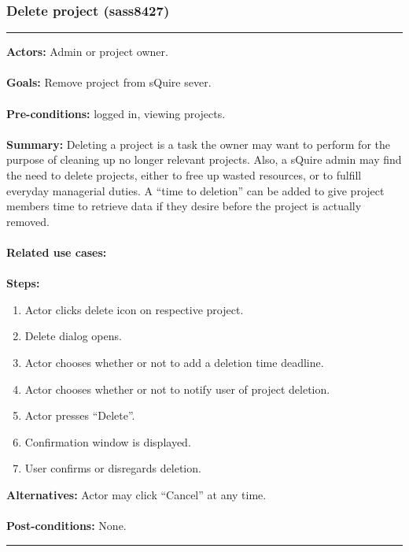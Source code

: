 \documentclass[11pt]{report}
\begin{document}
\subsubsection{Delete project (sass8427)}
\vspace{2pt}
\hrule
\vspace{8pt}
 \textbf{Actors:} Admin or project owner. \\ \\
\textbf{Goals:} Remove project from sQuire sever. \\ \\
 \textbf{Pre-conditions:} logged in, viewing projects.  \\ \\
\textbf{Summary:} Deleting a project is a task the owner may want to perform for the purpose of cleaning up no longer relevant projects. Also, a sQuire admin may find the need to delete projects, either to free up wasted resources, or to fulfill everyday managerial duties. A “time to deletion” can be added to give project members time to retrieve data if they desire before the project is actually removed. \\ \\
\textbf{Related use cases:} \\ \\
\textbf{Steps:} \begin{enumerate}
  \item Actor clicks delete icon on respective project.
  \item Delete dialog opens.
  \item Actor chooses whether or not to add a deletion time deadline. 
  \item Actor chooses whether or not to notify user of project deletion. 
  \item Actor presses “Delete”. 
  \item Confirmation window is displayed.
  \item User confirms or disregards deletion.
 \end{enumerate}
 \textbf{Alternatives:} Actor may click “Cancel” at any time. \\ \\
 \textbf{Post-conditions:} None. \\
\vspace{8pt}
\hrule
\newpage
\end{document}
